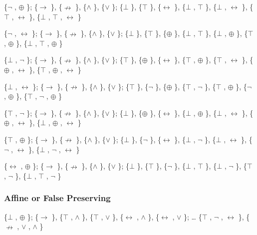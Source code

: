 \{$\neg$ , $\oplus$ \}; \{$\to$ \}, \{$\nrightarrow$ \}, \{$\land$ \}, \{$\lor$ \}; \{$\bot$ \}, \{$\top$ \}, \{$\leftrightarrow$ \}, \{$\bot$ , $\top$ \},
\{$\bot$ , $\leftrightarrow$ \}, \{$\top$ , $\leftrightarrow$ \}, \{$\bot$ , $\top$ , $\leftrightarrow$ \}

\{$\neg$ , $\leftrightarrow$ \}; \{$\to$ \}, \{$\nrightarrow$ \}, \{$\land$ \}, \{$\lor$ \}; \{$\bot$ \}, \{$\top$ \}, \{$\oplus$ \}, \{$\bot$ , $\top$ \},
\{$\bot$ , $\oplus$ \}, \{$\top$ , $\oplus$ \}, \{$\bot$ , $\top$ , $\oplus$ \}

\{$\bot$ , $\neg$ \}; \{$\to$ \}, \{$\nrightarrow$ \}, \{$\land$ \}, \{$\lor$ \}; \{$\top$ \}, \{$\oplus$ \}, \{$\leftrightarrow$ \}, \{$\top$ , $\oplus$ \},
\{$\top$ , $\leftrightarrow$ \}, \{$\oplus$ , $\leftrightarrow$ \}, \{$\top$ , $\oplus$ , $\leftrightarrow$ \}

\{$\bot$ , $\leftrightarrow$ \}; \{$\to$ \}, \{$\nrightarrow$ \}, \{$\land$ \}, \{$\lor$ \}; \{$\top$ \}, \{$\neg$ \}, \{$\oplus$ \}, \{$\top$ , $\neg$ \},
\{$\top$ , $\oplus$ \}, \{$\neg$ , $\oplus$ \}, \{$\top$ , $\neg$ , $\oplus$ \}

\{$\top$ , $\neg$ \}; \{$\to$ \}, \{$\nrightarrow$ \}, \{$\land$ \}, \{$\lor$ \}; \{$\bot$ \}, \{$\oplus$ \}, \{$\leftrightarrow$ \}, \{$\bot$ , $\oplus$ \},
\{$\bot$ , $\leftrightarrow$ \}, \{$\oplus$ , $\leftrightarrow$ \}, \{$\bot$ , $\oplus$ , $\leftrightarrow$ \}

\{$\top$ , $\oplus$ \}; \{$\to$ \}, \{$\nrightarrow$ \}, \{$\land$ \}, \{$\lor$ \}; \{$\bot$ \}, \{$\neg$ \}, \{$\leftrightarrow$ \}, \{$\bot$ , $\neg$ \},
\{$\bot$ , $\leftrightarrow$ \}, \{$\neg$ , $\leftrightarrow$ \}, \{$\bot$ , $\neg$ , $\leftrightarrow$ \}

\{$\leftrightarrow$ , $\oplus$ \}; \{$\to$ \}, \{$\nrightarrow$ \}, \{$\land$ \}, \{$\lor$ \}; \{$\bot$ \}, \{$\top$ \}, \{$\neg$ \}, \{$\bot$ , $\top$ \},
\{$\bot$ , $\neg$ \}, \{$\top$ , $\neg$ \}, \{$\bot$ , $\top$ , $\neg$ \}

\hypertarget{affine-or-false-preserving}{%
\subsubsection{Affine or False
Preserving}\label{affine-or-false-preserving}}

\{$\bot$ , $\oplus$ \}; \{$\to$ \}, \{$\top$ , $\land$ \}, \{$\top$ , $\lor$ \}, \{$\leftrightarrow$ , $\land$ \}, \{$\leftrightarrow$ , $\lor$ \}; \ldots{} \{$\top$ ,
$\neg$ , $\leftrightarrow$ \}, \{$\nrightarrow$ , $\lor$ , $\land$ \}

